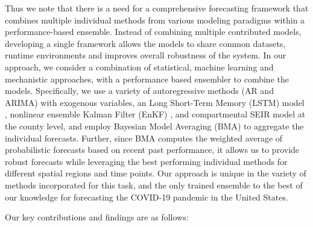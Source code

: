 \documentclass[sigconf]{acmart}
\begin{document}
Thus we note that there is a need for a comprehensive forecasting framework that combines multiple individual methods from various modeling paradigms within a performance-based ensemble. Instead of combining multiple contributed models, developing a single framework allows the models to share common datasets, runtime environments and improves overall robustness of the system. In our approach, we consider a combination of statistical, machine learning and mechanistic approaches, with a performance based ensembler to combine the models. Specifically, we use a variety of autoregressive methods (AR and ARIMA) \cite{prashant2019PLOSCompBio} with exogenous variables, an Long Short-Term Memory (LSTM) model \cite{hochreiter1997long}, nonlinear ensemble Kalman Filter (EnKF) \cite{yang2014comparison}, and compartmental SEIR model at the county level, and employ Bayesian Model Averaging (BMA) \cite{hoeting1999bayesian} to aggregate the individual forecasts. Further, since BMA computes the weighted average of probabilistic forecasts based on recent past performance, it allows us to provide robust forecasts while leveraging the best performing individual methods for different spatial regions and time points. Our approach is unique in the variety of methods incorporated for this task, and the only trained ensemble to the best of our knowledge for forecasting the COVID-19 pandemic in the United States. 

Our key contributions and findings are as follows:
\end{document}
